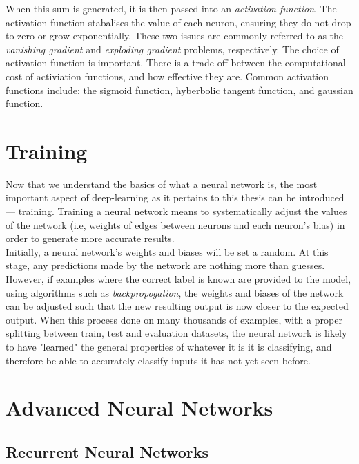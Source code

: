 \noindent
When this sum is generated, it is then passed into an \emph{activation function}.
The activation function stabalises the value of each neuron, ensuring they do not drop to zero or grow exponentially.
These two issues are commonly referred to as
the \emph{vanishing gradient} and \emph{exploding gradient} problems, respectively. 
The choice of activation function is important. There is a trade-off between the computational cost of activiation
functions, and how effective they are. Common activation functions include: the sigmoid function,
hyberbolic tangent function, and gaussian function.\\

\section{Training}
\noindent
Now that we understand the basics of what a neural network is, the most important aspect of deep-learning as it pertains to this thesis can be introduced --- training. Training a neural network means to systematically adjust the values of the network (i.e, weights of edges between neurons and each neuron's bias) in order to generate more accurate results.\\

\noindent
Initially, a neural network's weights and biases will be set a random. At this stage, any predictions made by the network are nothing more than guesses. However, if examples where the correct label is known are provided to the model, using algorithms such as \emph{backpropogation}, the weights and biases of the network can be adjusted such that the new resulting output is now closer to the expected output. When this process done on many thousands of examples, with a proper splitting between train, test and evaluation datasets, the neural network is likely to have "learned" the general properties of whatever it is it is classifying, and therefore be able to accurately classify inputs it has not yet seen before. \\

\section{Advanced Neural Networks}

\subsection{Recurrent Neural Networks}

